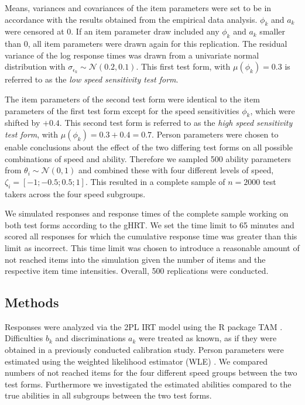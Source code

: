 \documentclass[a4paper,man,apacite,donotrepeattitle]{apa6}
\begin{document}
Means, variances and covariances of the item parameters were set to be in accordance with the results obtained from the empirical data analysis. $\phi_{k}$ and $a_{k}$ were censored at 0. If an item parameter draw included any $\phi_{k}$ and $a_{k}$ smaller than 0, all item parameters were drawn again for this replication. The residual variance of the log response times was drawn from a univariate normal distribution with $\sigma_{\epsilon_{k}} \sim \mathcal{N}(0.2, 0.1)$. This first test form, with $\mu(\phi_{k}) = 0.3$ is referred to as the \textit{low speed sensitivity test form}. 

The item parameters of the second test form were identical to the item parameters of the first test form except for the speed sensitivities $\phi_{k}$, which were shifted by $ + 0.4$. This second test form is referred to as the \textit{high speed sensitivity test form}, with $\mu(\phi_{k}) = 0.3 + 0.4 = 0.7$. Person parameters were chosen to enable conclusions about the effect of the two differing test forms on all possible combinations of speed and ability. Therefore we sampled 500 ability parameters from $\theta_{i} \sim \mathcal{N}(0, 1)$ and combined these with four different levels of speed, $\zeta_{i} = [-1; -0.5; 0.5; 1]$. This resulted in a complete sample of $n = 2000$ test takers across the four speed subgroups. 

We simulated responses and response times of the complete sample working on both test forms according to the gHRT. We set the time limit to 65 minutes and scored all responses for which the cumulative response time was greater than this limit as incorrect. This time limit was chosen to introduce a reasonable amount of not reached items into the simulation given the number of items and the respective item time intensities. Overall, 500 replications were conducted. 

\subsection{Methods}
Responses were analyzed via the 2PL IRT model using the R package TAM \cite{Robitzsch.TAM}. Difficulties $b_{k}$ and discriminations $a_{k}$ were treated as known, as if they were obtained in a previously conducted calibration study. Person parameters were estimated using the weighted likelihood estimator (WLE) \cite{Warm.1989}. We compared numbers of not reached items for the four different speed groups between the two test forms. Furthermore we investigated the estimated abilities compared to the true abilities in all subgroups between the two test forms.
\end{document}
